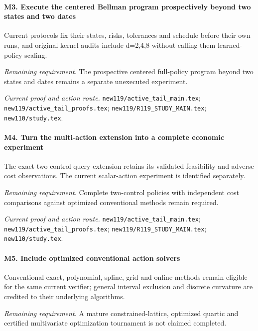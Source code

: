 \paragraph{M3. Execute the centered Bellman program prospectively beyond two states and two dates}

Current protocols fix their states, risks, tolerances and schedule before their own runs, and original kernel audits include d=2,4,8 without calling them learned-policy scaling.

\par\emph{Remaining requirement.} The prospective centered full-policy program beyond two states and dates remains a separate unexecuted experiment.

\par\emph{Current proof and action route.} \nolinkurl{new119/active_tail_main.tex}; \nolinkurl{new119/active_tail_proofs.tex}; \nolinkurl{new119/R119_STUDY_MAIN.tex}; \nolinkurl{new110/study.tex}.

\paragraph{M4. Turn the multi-action extension into a complete economic experiment}

The exact two-control query extension retains its validated feasibility and adverse cost observations. The current scalar-action experiment is identified separately.

\par\emph{Remaining requirement.} Complete two-control policies with independent cost comparisons against optimized conventional methods remain required.

\par\emph{Current proof and action route.} \nolinkurl{new119/active_tail_main.tex}; \nolinkurl{new119/active_tail_proofs.tex}; \nolinkurl{new119/R119_STUDY_MAIN.tex}; \nolinkurl{new110/study.tex}.

\paragraph{M5. Include optimized conventional action solvers}

Conventional exact, polynomial, spline, grid and online methods remain eligible for the same current verifier; general interval exclusion and discrete curvature are credited to their underlying algorithms.

\par\emph{Remaining requirement.} A mature constrained-lattice, optimized quartic and certified multivariate optimization tournament is not claimed completed.

